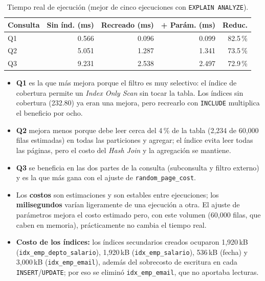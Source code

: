 \documentclass[12pt,a4paper]{article}
\begin{document}
\begin{table}[H]
\centering
\small
\renewcommand{\arraystretch}{1.3}
\begin{tabular}{lrrrr}
\toprule
\textbf{Consulta} & \textbf{Sin índ. (ms)} & \textbf{Recreado (ms)} & \textbf{+ Parám. (ms)} & \textbf{Reduc.} \\
\midrule
Q1 & 0.566 & 0.096 & 0.099 & 82.5\,\% \\
Q2 & 5.051 & 1.287 & 1.341 & 73.5\,\% \\
Q3 & 9.231 & 2.538 & 2.497 & 72.9\,\% \\
\bottomrule
\end{tabular}
\caption{Tiempo real de ejecución (mejor de cinco ejecuciones con \texttt{EXPLAIN ANALYZE}).}
\end{table}

\begin{itemize}
    \item \textbf{Q1} es la que más mejora porque el filtro es muy selectivo: el índice de cobertura permite un \textit{Index Only Scan} sin tocar la tabla. Los índices sin cobertura (232.80) ya eran una mejora, pero recrearlo con \texttt{INCLUDE} multiplica el beneficio por ocho.
    \item \textbf{Q2} mejora menos porque debe leer cerca del 4\,\% de la tabla (2,234 de 60,000 filas estimadas) en todas las particiones y agregar; el índice evita leer todas las páginas, pero el costo del \textit{Hash Join} y la agregación se mantiene.
    \item \textbf{Q3} se beneficia en las dos partes de la consulta (subconsulta y filtro externo) y es la que más gana con el ajuste de \texttt{random\_\allowbreak{}page\_\allowbreak{}cost}.
    \item Los \textbf{costos} son estimaciones y son estables entre ejecuciones; los \textbf{milisegundos} varían ligeramente de una ejecución a otra. El ajuste de parámetros mejora el costo estimado pero, con este volumen (60,000 filas, que caben en memoria), prácticamente no cambia el tiempo real.
    \item \textbf{Costo de los índices:} los índices secundarios creados ocuparon 1,920\,kB (\texttt{idx\_\allowbreak{}emp\_\allowbreak{}depto\_\allowbreak{}salario}), 1,920\,kB (\texttt{idx\_\allowbreak{}emp\_\allowbreak{}salario}), 536\,kB (fecha) y 3,000\,kB (\texttt{idx\_\allowbreak{}emp\_\allowbreak{}email}), además del sobrecosto de escritura en cada \texttt{INSERT}/\texttt{UPDATE}; por eso se eliminó \texttt{idx\_\allowbreak{}emp\_\allowbreak{}email}, que no aportaba lecturas.
\end{itemize}
\end{document}
